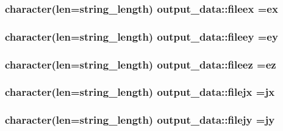 \subsubsection[{\texorpdfstring{fileex}{fileex}}]{\setlength{\rightskip}{0pt plus 5cm}character(len=string\+\_\+length) output\+\_\+data\+::fileex =\textquotesingle{}ex\textquotesingle{}}\hypertarget{namespaceoutput__data_aa8d95fb60904ef94d39d3c06ebc6d4d7}{}\label{namespaceoutput__data_aa8d95fb60904ef94d39d3c06ebc6d4d7}
\subsubsection[{\texorpdfstring{fileey}{fileey}}]{\setlength{\rightskip}{0pt plus 5cm}character(len=string\+\_\+length) output\+\_\+data\+::fileey =\textquotesingle{}ey\textquotesingle{}}\hypertarget{namespaceoutput__data_a368d30c58c5484d6e8caf5e536d2da0c}{}\label{namespaceoutput__data_a368d30c58c5484d6e8caf5e536d2da0c}
\subsubsection[{\texorpdfstring{fileez}{fileez}}]{\setlength{\rightskip}{0pt plus 5cm}character(len=string\+\_\+length) output\+\_\+data\+::fileez =\textquotesingle{}ez\textquotesingle{}}\hypertarget{namespaceoutput__data_ab01ba0f2c67ee55da96a855e8da8382c}{}\label{namespaceoutput__data_ab01ba0f2c67ee55da96a855e8da8382c}
\subsubsection[{\texorpdfstring{filejx}{filejx}}]{\setlength{\rightskip}{0pt plus 5cm}character(len=string\+\_\+length) output\+\_\+data\+::filejx =\textquotesingle{}jx\textquotesingle{}}\hypertarget{namespaceoutput__data_a1e0f229429f07c107635c7844afa8d39}{}\label{namespaceoutput__data_a1e0f229429f07c107635c7844afa8d39}
\subsubsection[{\texorpdfstring{filejy}{filejy}}]{\setlength{\rightskip}{0pt plus 5cm}character(len=string\+\_\+length) output\+\_\+data\+::filejy =\textquotesingle{}jy\textquotesingle{}}\hypertarget{namespaceoutput__data_afaf1fb3c71c81a246f6af6ca881610ec}{}\label{namespaceoutput__data_afaf1fb3c71c81a246f6af6ca881610ec}
